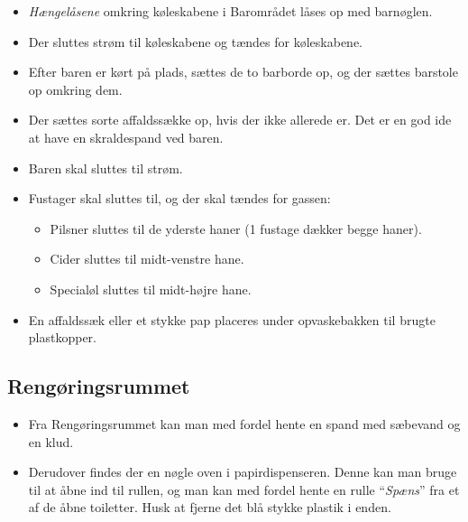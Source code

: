 \begin{itemize}
    \item \textit{Hængelåsene} omkring køleskabene i Barområdet låses op med barnøglen.
	\item Der sluttes strøm til køleskabene og tændes for køleskabene.
	\item Efter baren er kørt på plads, sættes de to barborde op, og der sættes barstole op omkring dem.
	\item Der sættes sorte affaldssække op, hvis der ikke allerede er.
	Det er en god ide at have en skraldespand ved baren.
	\item Baren skal sluttes til strøm.
	\item Fustager skal sluttes til, og der skal tændes for gassen:
	\begin{itemize}
		\item Pilsner sluttes til de yderste haner (1 fustage dækker begge
		haner).
		\item Cider sluttes til midt-venstre hane.
		\item Specialøl sluttes til midt-højre hane.
	\end{itemize}
	\item En affaldssæk eller et stykke pap placeres under opvaskebakken til brugte plastkopper.
\end{itemize}

\subsection{Rengøringsrummet}
\label{sec:pre:rengøring}
\begin{itemize}
	\item Fra Rengøringsrummet kan man med fordel hente en spand med sæbevand og en klud.
	\item Derudover findes der en nøgle oven i papirdispenseren. Denne kan man bruge til
	at åbne ind til rullen, og man kan med fordel hente en rulle ``\textit{Spæns}''
	fra et af de åbne toiletter. Husk at fjerne det blå stykke plastik i enden.
\end{itemize}
